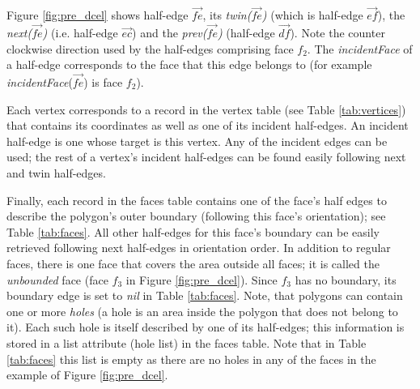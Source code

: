 Figure \ref{fig:pre_dcel} shows half-edge $\overrightarrow{fe}$, its \textit{twin($\overrightarrow{fe}$)} (which is half-edge $\overrightarrow{ef}$), the \textit{next($\overrightarrow{fe}$)} (i.e. half-edge $\overrightarrow{ec}$) and the \textit{prev($\overrightarrow{fe}$)} (half-edge $\overrightarrow{df}$). Note the counter clockwise direction used by the half-edges comprising face $f_2$. 
The \textit{incidentFace} of a half-edge corresponds to the face that this edge belongs to (for example \textit{incidentFace}($\overrightarrow{fe}$) is face $f_2$).

Each vertex corresponds to a record in the vertex table (see Table \ref{tab:vertices}) that contains its coordinates as well as one of its incident half-edges. An incident half-edge is one whose target is this vertex. Any of the incident edges can be used; the rest of a vertex's incident half-edges can be found easily following next and twin half-edges.

Finally, each record in the faces table contains one of the face's half edges to describe the polygon's outer boundary (following this face's orientation); see Table \ref{tab:faces}. 
All other half-edges for this face's boundary can be easily retrieved following next half-edges in orientation order.
In addition to regular faces, there is one face that covers the area outside all faces; it is called the  \textit{unbounded} face (face $f_3$ in Figure \ref{fig:pre_dcel}). 
Since $f_3$ has no boundary, its boundary edge is set to \textit{nil} in Table \ref{tab:faces}.
Note, that polygons can contain one or more \textit{holes} (a hole is an area inside the polygon that does not belong to it). 
Each such hole is itself described by one of its half-edges; this information is stored in a list attribute (hole list) in the faces table. Note that in Table \ref{tab:faces} this list is empty as there are no holes in any of the faces in the example of Figure \ref{fig:pre_dcel}. 



